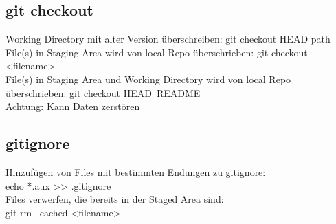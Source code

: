 \subsection{git checkout}
Working Directory mit alter Version 
überschreiben: git checkout HEAD path \\

File(s) in  Staging Area wird von local Repo
überschrieben: git checkout <filename> \\

File(s) in Staging Area und Working Directory 
wird von local Repo überschrieben: git checkout HEAD README \\
Achtung: Kann Daten zerstören


\subsection{gitignore}

Hinzufügen von Files mit bestimmten Endungen zu gitignore: \\
echo *.aux >> .gitignore \\
Files verwerfen, die bereits in der Staged Area sind: \\
git rm --cached <filename>